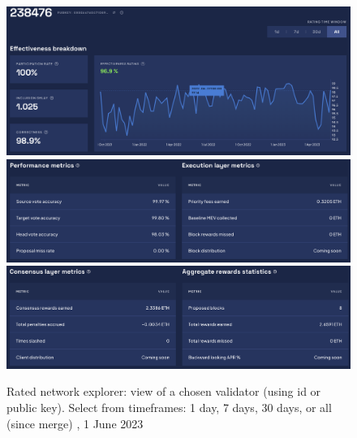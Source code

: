 \documentclass[UTF8]{article}
\begin{document}
{\begin{figure}[htbp]
\begin{center}
\includegraphics[width=\linewidth]{images/ratedentity4a}\\
\includegraphics[width=\linewidth]{images/ratedentity4b}\\
\includegraphics[width=\linewidth]{images/ratedentity4c}
\caption{Rated network explorer: view of a chosen validator (using id or public key). Select from timeframes: 1 day, 7 days, 30 days, or all (since merge) , 1 June 2023}
\label{fig:ratedentity4}
\end{center}
\end{figure}
\clearpage

}
\end{document}
